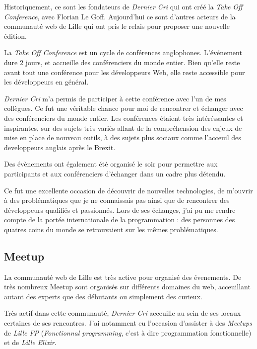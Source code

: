 \bigskip

Historiquement, ce sont les fondateurs de \emph{Dernier Cri} qui ont
créé la \emph{Take Off Conference}, avec Florian Le Goff. Aujourd'hui ce
sont d'autres acteurs de la communauté web de Lille qui ont pris le
relais pour proposer une nouvelle édition.

\bigskip

La \emph{Take Off Conference} est un cycle de conférences anglophones.
L'événement dure 2 jours, et accueille des conférenciers du monde
entier. Bien qu'elle reste avant tout une conférence pour les
développeurs Web, elle reste accessible pour les développeurs en
général.

\bigskip

\emph{Dernier Cri} m'a permis de participer à cette conférence avec l'un
de mes collègues. Ce fut une véritable chance pour moi de rencontrer et
échanger avec des conférenciers du monde entier. Les conférences étaient
très intéréssantes et inspirantes, sur des sujets très variés allant de
la compréhension des enjeux de mise en place de nouveau outils, à des
sujets plus sociaux comme l'acceuil des developpeurs anglais après le
Brexit.

\bigskip

Des évènements ont également été organisé le soir pour permettre aux
participants et aux conférenciers d'échanger dans un cadre plus détendu.

\bigskip

Ce fut une excellente occasion de découvrir de nouvelles technologies,
de m'ouvrir à des problématiques que je ne connaissais pas ainsi que de
rencontrer des développeurs qualifiés et passionnés. Lors de ses
échanges, j'ai pu me rendre compte de la portée internationale de la
programmation : des personnes des quatres coins du monde se retrouvaient
sur les mêmes problématiques.

\bigskip

\subsection{Meetup}\label{meetup}

\bigskip

La communauté web de Lille est très active pour organisé des évenements.
De très nombreux Meetup sont organisés sur différents domaines du web,
acceuillant autant des experts que des débutants ou simplement des
curieux.

\bigskip

Très actif dans cette communauté, \emph{Dernier Cri} acceuille au sein
de ses locaux certaines de ses rencontres. J'ai notamment eu l'occasion
d'assister à des \emph{Meetups} de \emph{Lille FP} (\emph{Fonctionnal
programming}, c'est à dire programmation fonctionnelle) et de
\emph{Lille Elixir}.

